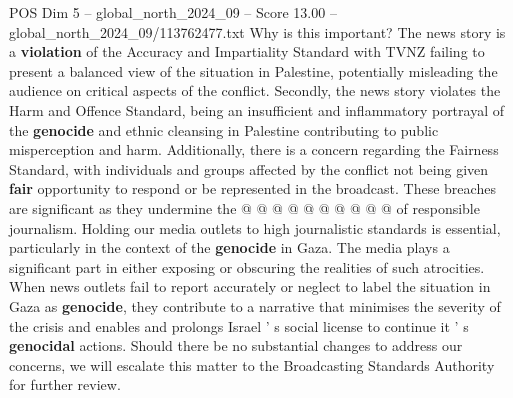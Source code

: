 \begin{textsample}{POS Dim 5 – global\_north\_2024\_09 – Score 13.00 – global\_north\_2024\_09/113762477.txt}
Why is this important?
The news story is a \textbf{violation} of the Accuracy and Impartiality Standard with TVNZ failing to present a balanced view of the situation in Palestine, potentially misleading the audience on critical aspects of the conflict.
Secondly, the news story violates the Harm and Offence Standard, being an insufficient and inflammatory portrayal of the \textbf{genocide} and ethnic cleansing in Palestine contributing to public misperception and harm.
Additionally, there is a concern regarding the Fairness Standard, with individuals and groups affected by the conflict not being given \textbf{fair} opportunity to respond or be represented in the broadcast.
These breaches are significant as they undermine the @ @ @ @ @ @ @ @ @ @ of responsible journalism.
Holding our media outlets to high journalistic standards is essential, particularly in the context of the \textbf{genocide} in Gaza.
The media plays a significant part in either exposing or obscuring the realities of such atrocities.
When news outlets fail to report accurately or neglect to label the situation in Gaza as \textbf{genocide}, they contribute to a narrative that minimises the severity of the crisis and enables and prolongs Israel ' s social license to continue it ' s \textbf{genocidal} actions.
Should there be no substantial changes to address our concerns, we will escalate this matter to the Broadcasting Standards Authority for further review.

\end{textsample}
